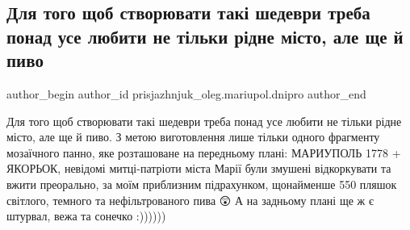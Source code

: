  
 
 
 
 

\subsection{Для того щоб створювати такі шедеври треба понад усе любити не тільки рідне місто, але ще й пиво}
\label{sec:30_04_2020.fb.prisjazhnjuk_oleg.mariupol.dnipro.1.shedevry_pivo_mozaika}

\ifcmt
 author_begin
   author_id prisjazhnjuk_oleg.mariupol.dnipro
 author_end
\fi

Для того щоб створювати такі шедеври треба понад усе любити не тільки рідне
місто, але ще й пиво.  З метою виготовлення лише тільки одного фрагменту
мозаїчного панно, яке розташоване на передньому плані: МАРИУПОЛЬ 1778 +
ЯКОРЬОК, невідомі митці-патріоти міста Марії були змушені відкоркувати та вжити
преорально, за моїм приблизним підрахунком, щонайменше 550 пляшок світлого,
темного та нефільтрованого пива 😲 А на задньому плані ще ж є штурвал, вежа та
сонечко :))))))


